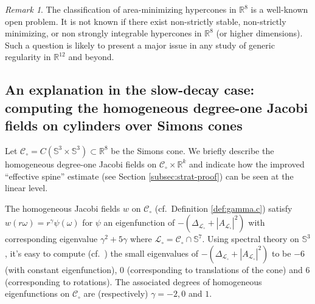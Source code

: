 \documentclass[11pt, letterpaper, reqno]{amsart}
\numberwithin{equation}{section}
\theoremstyle{remark}
\newtheorem{Rem}[Def]{Remark}
\newcommand{\RR}{\mathbb{R}}
\newcommand{\cC}{\mathcal{C}}
\newcommand{\cL}{\mathcal{L}}
\begin{document}
\begin{Rem}\label{rem:R12}
The classification of area-minimizing hypercones in $\RR^8$ is a well-known open problem. It is not known if there exist non-strictly stable, non-strictly minimizing, or non strongly integrable hypercones in $\RR^8$ (or higher dimensions). Such a question is likely to present a major issue in any study of generic regularity in $\RR^{12}$ and beyond.
\end{Rem}

\subsection{An explanation in the slow-decay case: computing the homogeneous degree-one Jacobi fields on cylinders over Simons cones}
Let $\cC_\circ = C(\mathbb{S}^3\times \mathbb{S}^3) \subset \RR^8$ be the Simons cone. We briefly describe the homogeneous degree-one Jacobi fields on $\cC_\circ \times \RR^k$ and indicate how the improved ``effective spine'' estimate (see Section \ref{subsec:strat-proof}) can be seen at the linear level. 

The homogeneous Jacobi fields $w$ on $\cC_\circ$ (cf.\ Definition \ref{def:gamma.c}) satisfy $w(r\omega) = r^\gamma \psi(\omega)$ for $\psi$ an eigenfunction of $-(\Delta_{\cL_\circ} + |A_{\cL_\circ}|^2)$ with corresponding eigenvalue $\gamma^2 + 5 \gamma$ where $\cL_\circ =\cC_\circ \cap \mathbb{S}^7$. Using spectral theory on $\mathbb{S}^3$, it's easy to compute (cf.\ \cite{SimonSolomon:quadratic}) the small eigenvalues of $-(\Delta_{\cL_\circ} + |A_{\cL_\circ}|^2)$ to be $-6$ (with constant eigenfunction), $0$ (corresponding to translations of the cone) and $6$ (corresponding to rotations). The associated degrees of homogeneous eigenfunctions on $\cC_\circ$ are (respectively) $\gamma = -2,0$ and $1$. 
\end{document}
